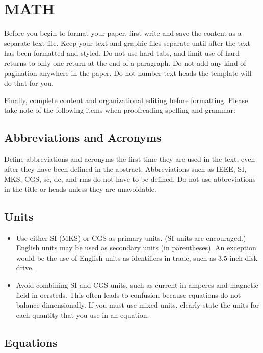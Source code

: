 \documentclass[letterpaper, 10 pt, conference]{ieeeconf}  %
\begin{document}
\section{MATH}

Before you begin to format your paper, first write and save the content as a separate text file. Keep your text and graphic files separate until after the text has been formatted and styled. Do not use hard tabs, and limit use of hard returns to only one return at the end of a paragraph. Do not add any kind of pagination anywhere in the paper. Do not number text heads-the template will do that for you.

Finally, complete content and organizational editing before formatting. Please take note of the following items when proofreading spelling and grammar:

\subsection{Abbreviations and Acronyms} Define abbreviations and acronyms the first time they are used in the text, even after they have been defined in the abstract. Abbreviations such as IEEE, SI, MKS, CGS, sc, dc, and rms do not have to be defined. Do not use abbreviations in the title or heads unless they are unavoidable.

\subsection{Units}

\begin{itemize}

\item Use either SI (MKS) or CGS as primary units. (SI units are encouraged.) English units may be used as secondary units (in parentheses). An exception would be the use of English units as identifiers in trade, such as 3.5-inch disk drive.
\item Avoid combining SI and CGS units, such as current in amperes and magnetic field in oersteds. This often leads to confusion because equations do not balance dimensionally. If you must use mixed units, clearly state the units for each quantity that you use in an equation.
\end{itemize}


\subsection{Equations}
\end{document}
